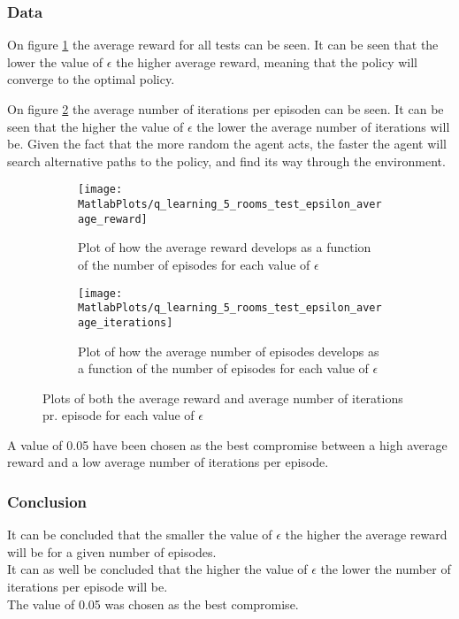 \documentclass[../Head/Main.tex]{subfiles}
\begin{document}
\clearpage
\subsubsection{Data}
On figure \ref{fig:q-learn_epsilon_reward} the average reward for all tests can be seen. It can be seen that the lower the value of $\epsilon$ the higher average reward, meaning that the policy will converge to the optimal policy.\par
On figure \ref{fig:q-learn_epsilon_iterations} the average number of iterations per episoden can be seen. It can be seen that the higher the value of $\epsilon$ the lower the average number of iterations will be. Given the fact that the more random the agent acts, the faster the agent will search alternative paths to the policy, and find its way through the environment.  
\begin{figure}[H]
	\centering
	\begin{subfigure}[b]{0.49\textwidth}
		\centering
		\texttt{[image: MatlabPlots/q\_learning\_5\_rooms\_test\_epsilon\_average\_reward]}
		\caption{Plot of how the average reward develops as a function of the number of episodes for each value of $\epsilon$}
		\label{fig:q-learn_epsilon_reward}
	\end{subfigure}
	\hfill
	\begin{subfigure}[b]{0.49\textwidth}
		\centering
		\texttt{[image: MatlabPlots/q\_learning\_5\_rooms\_test\_epsilon\_average\_iterations]}
		\caption{Plot of how the average number of episodes develops as a function of the number of episodes for each value of $\epsilon$}
		\label{fig:q-learn_epsilon_iterations}
	\end{subfigure}
	\caption{Plots of both the average reward and average number of iterations pr. episode for each value of $\epsilon$}
	\label{fig:q-learn_epsilon}
\end{figure}
A value of 0.05 have been chosen as the best compromise between a high average reward and a low average number of iterations per episode.

\subsubsection{Conclusion}
It can be concluded that the smaller the value of $\epsilon$ the higher the average reward will be for a given number of episodes.\\
It can as well be concluded that the higher the value of $\epsilon$ the lower the number of iterations per episode will be.\\ 
The value of 0.05 was chosen as the best compromise.
\end{document}
